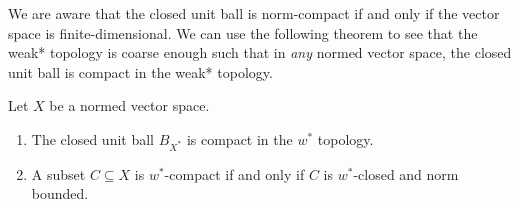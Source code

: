 \documentclass[10pt]{mypackage}
\begin{document}
We are aware that the closed unit ball is norm-compact if and only if the vector space is finite-dimensional. We can use the following theorem to see that the weak* topology is coarse enough such that in \textit{any} normed vector space, the closed unit ball is compact in the weak* topology.
\begin{theorem}
  Let $X$ be a normed vector space.
  \begin{enumerate}[(1)]
    \item The closed unit ball $B_{X^{\ast}}$ is compact in the $w^{\ast}$ topology.
    \item A subset $C\subseteq X$ is $w^{\ast}$-compact if and only if $C$ is $w^{\ast}$-closed and norm bounded.
  \end{enumerate}
\end{theorem}
\end{document}
